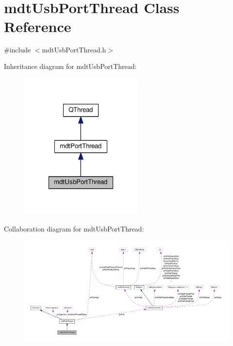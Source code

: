 \hypertarget{classmdt_usb_port_thread}{\section{mdt\-Usb\-Port\-Thread Class Reference}
\label{classmdt_usb_port_thread}
}


{\ttfamily \#include $<$mdt\-Usb\-Port\-Thread.\-h$>$}



Inheritance diagram for mdt\-Usb\-Port\-Thread\-:\nopagebreak
\begin{figure}[H]
\begin{center}
\leavevmode
\includegraphics[width=178pt]{classmdt_usb_port_thread__inherit__graph}
\end{center}
\end{figure}


Collaboration diagram for mdt\-Usb\-Port\-Thread\-:\nopagebreak
\begin{figure}[H]
\begin{center}
\leavevmode
\includegraphics[width=350pt]{classmdt_usb_port_thread__coll__graph}
\end{center}
\end{figure}
